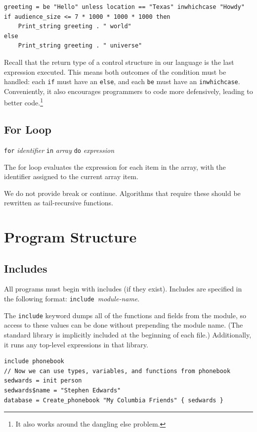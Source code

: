 \documentclass[11pt, onecolumn, letterpaper]{article}
\begin{document}
\begin{lstlisting}
greeting = be "Hello" unless location == "Texas" inwhichcase "Howdy"
if audience_size <= 7 * 1000 * 1000 * 1000 then
    Print_string greeting . " world"
else
    Print_string greeting . " universe"
\end{lstlisting}

Recall that the return type of a control structure in our language is the last expression executed. This means both outcomes of the condition must be handled: each \texttt{if} must have an \texttt{else}, and each \texttt{be} must have an \texttt{inwhichcase}. Conveniently, it also encourages programmers to code more defensively, leading to better code.\footnote{It also works around the dangling else problem.}

\subsection{For Loop}
\texttt{for} \textit{identifier} \texttt{in} \textit{array} \texttt{do} \textit{expression}

The for loop evaluates the expression for each item in the array, with the identifier assigned to the current array item.

We do not provide break or continue. Algorithms that require these should be rewritten as tail-recursive functions.

\section{Program Structure}
\subsection{Includes}
All programs must begin with includes (if they exist). Includes are specified in the following format: \texttt{include}~\textit{module-name}. 

The \texttt{include} keyword dumps all of the functions and fields from the module, so access to these values can be done without prepending the module name. (The standard library is implicitly included at the beginning of each file.) Additionally, it runs any top-level expressions in that library.

\begin{lstlisting}
include phonebook
// Now we can use types, variables, and functions from phonebook
sedwards = init person
sedwards$name = "Stephen Edwards"
database = Create_phonebook "My Columbia Friends" { sedwards }
\end{lstlisting}
\end{document}
